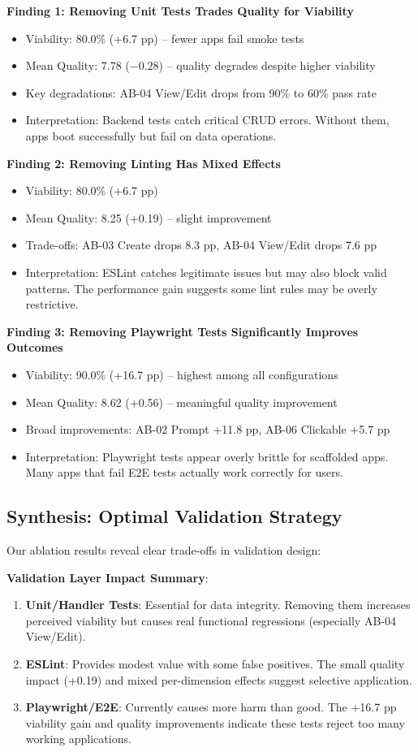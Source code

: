 \documentclass{article}
\begin{document}
\textbf{Finding 1: Removing Unit Tests Trades Quality for Viability}
\begin{itemize}
\item Viability: 80.0\% (+6.7 pp) -- fewer apps fail smoke tests
\item Mean Quality: 7.78 ($-0.28$) -- quality degrades despite higher viability
\item Key degradations: AB-04 View/Edit drops from 90\% to 60\% pass rate
\item Interpretation: Backend tests catch critical CRUD errors. Without them, apps boot successfully but fail on data operations.
\end{itemize}

\textbf{Finding 2: Removing Linting Has Mixed Effects}
\begin{itemize}
\item Viability: 80.0\% (+6.7 pp)
\item Mean Quality: 8.25 (+0.19) -- slight improvement
\item Trade-offs: AB-03 Create drops 8.3 pp, AB-04 View/Edit drops 7.6 pp
\item Interpretation: ESLint catches legitimate issues but may also block valid patterns. The performance gain suggests some lint rules may be overly restrictive.
\end{itemize}

\textbf{Finding 3: Removing Playwright Tests Significantly Improves Outcomes}
\begin{itemize}
\item Viability: 90.0\% (+16.7 pp) -- highest among all configurations
\item Mean Quality: 8.62 (+0.56) -- meaningful quality improvement
\item Broad improvements: AB-02 Prompt +11.8 pp, AB-06 Clickable +5.7 pp
\item Interpretation: Playwright tests appear overly brittle for scaffolded apps. Many apps that fail E2E tests actually work correctly for users.
\end{itemize}

\subsection{Synthesis: Optimal Validation Strategy}

Our ablation results reveal clear trade-offs in validation design:

\textbf{Validation Layer Impact Summary}:
\begin{enumerate}
\item \textbf{Unit/Handler Tests}: Essential for data integrity. Removing them increases perceived viability but causes real functional regressions (especially AB-04 View/Edit).
\item \textbf{ESLint}: Provides modest value with some false positives. The small quality impact (+0.19) and mixed per-dimension effects suggest selective application.
\item \textbf{Playwright/E2E}: Currently causes more harm than good. The +16.7 pp viability gain and quality improvements indicate these tests reject too many working applications.
\end{enumerate}
\end{document}
